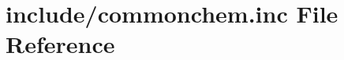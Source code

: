 \hypertarget{commonchem_8inc}{\section{include/commonchem.inc File Reference}
\label{commonchem_8inc}
}
